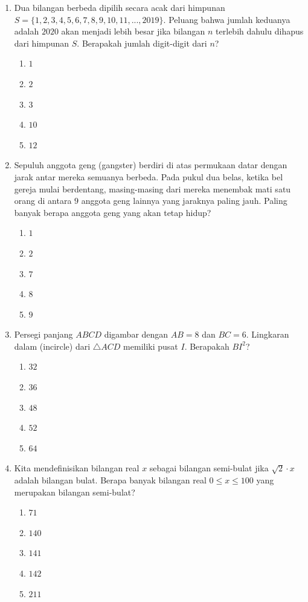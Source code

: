 \documentclass{article}
\begin{document}
\begin{enumerate}
\item Dua bilangan berbeda dipilih secara acak dari himpunan $S=\{1,2,3,4,5,6,7,8,9,10,11,...,2019\}$. Peluang bahwa jumlah keduanya adalah $2020$ akan menjadi lebih besar jika bilangan $n$ terlebih dahulu dihapus dari himpunan $S$. Berapakah jumlah digit-digit dari $n$?
\begin{enumerate}
    \item $1$
    \item $2$
    \item $3$
    \item $10$
    \item $12$
\end{enumerate}

\item Sepuluh anggota geng (gangster) berdiri di atas permukaan datar dengan jarak antar mereka semuanya berbeda. Pada pukul dua belas, ketika bel gereja mulai berdentang, masing-masing dari mereka menembak mati satu orang di antara $9$ anggota geng lainnya yang jaraknya paling jauh. Paling banyak berapa anggota geng yang akan tetap hidup?
\begin{enumerate}
    \item $1$
    \item $2$
    \item $7$
    \item $8$
    \item $9$
\end{enumerate}

\item Persegi panjang $ABCD$ digambar dengan $AB=8$ dan $BC=6$. Lingkaran dalam (incircle) dari $\triangle ACD$ memiliki pusat $I$. Berapakah $BI^{2}$?
\begin{enumerate}
    \item $32$
    \item $36$
    \item $48$
    \item $52$
    \item $64$
\end{enumerate}

\item Kita mendefinisikan bilangan real $x$ sebagai bilangan semi-bulat jika $\sqrt{2}\cdot x$ adalah bilangan bulat. Berapa banyak bilangan real $0\le x\le100$ yang merupakan bilangan semi-bulat?
\begin{enumerate}
    \item $71$
    \item $140$
    \item $141$
    \item $142$
    \item $211$
\end{enumerate}


\end{enumerate}
\end{document}
